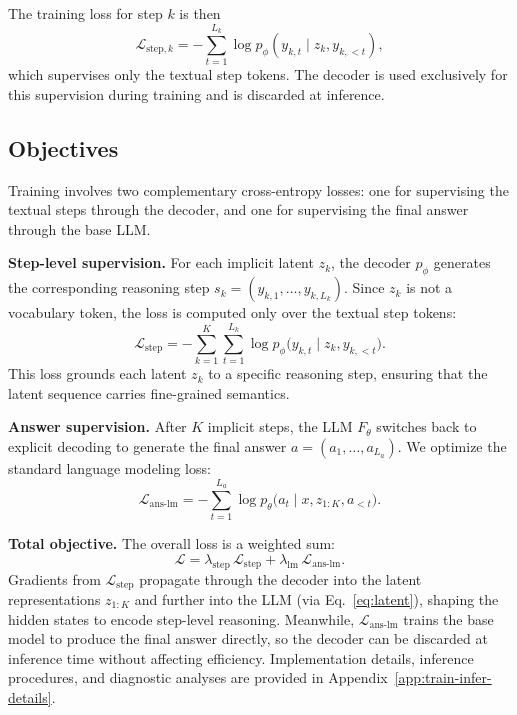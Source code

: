 The training loss for step $k$ is then
\[
\mathcal{L}_{\text{step},k} = - \sum_{t=1}^{L_k} \log p_\phi(y_{k,t} \mid z_k, y_{k,<t}),
\]
which supervises only the textual step tokens.  
The decoder is used exclusively for this supervision during training and is discarded at inference.

\subsection{Objectives}
Training involves two complementary cross-entropy losses: one for supervising the textual steps through the decoder, and one for supervising the final answer through the base LLM.

\noindent \textbf{Step-level supervision.}
For each implicit latent $z_k$, the decoder $p_\phi$ generates the corresponding reasoning step $s_k=(y_{k,1},\ldots,y_{k,L_k})$.  
Since $z_k$ is not a vocabulary token, the loss is computed only over the textual step tokens:
\begin{equation}
\mathcal{L}_{\text{step}}
= - \sum_{k=1}^{K}\sum_{t=1}^{L_k}
\log p_\phi\!\big(y_{k,t}\mid z_k, y_{k,<t}\big).
\end{equation}
This loss grounds each latent $z_k$ to a specific reasoning step, ensuring that the latent sequence carries fine-grained semantics.

\noindent \textbf{Answer supervision.}
After $K$ implicit steps, the LLM $F_\theta$ switches back to explicit decoding to generate the final answer $a=(a_1,\ldots,a_{L_a})$.  
We optimize the standard language modeling loss:
\begin{equation}
\mathcal{L}_{\text{ans-lm}}
= - \sum_{t=1}^{L_a}
\log p_\theta\!\big(a_t \mid x, z_{1:K}, a_{<t}\big).
\end{equation}

\noindent \textbf{Total objective.}
The overall loss is a weighted sum:
\begin{equation}
\mathcal{L}
= \lambda_{\text{step}}\,\mathcal{L}_{\text{step}}
+ \lambda_{\text{lm}}\,\mathcal{L}_{\text{ans-lm}} .
\label{eq:total}
\end{equation}
Gradients from $\mathcal{L}_{\text{step}}$ propagate through the decoder into the latent representations $z_{1:K}$ and further into the LLM (via Eq.~\eqref{eq:latent}), shaping the hidden states to encode step-level reasoning.  
Meanwhile, $\mathcal{L}_{\text{ans-lm}}$ trains the base model to produce the final answer directly, so the decoder can be discarded at inference time without affecting efficiency.
Implementation details, inference procedures, and diagnostic analyses are provided in Appendix~\ref{app:train-infer-details}.

